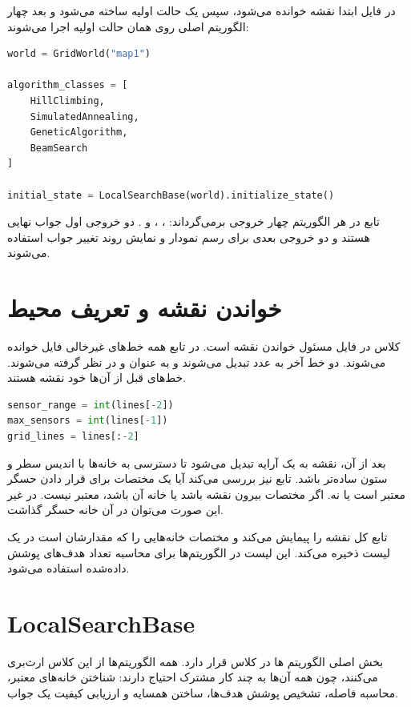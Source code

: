 \documentclass[10.5pt]{exam}
\begin{document}
در فایل
ابتدا نقشه خوانده می‌شود، سپس یک حالت اولیه ساخته می‌شود و بعد چهار الگوریتم اصلی روی همان حالت اولیه اجرا می‌شوند:

\begin{latin}
\begin{lstlisting}[language=Python]
world = GridWorld("map1")

algorithm_classes = [
    HillClimbing,
    SimulatedAnnealing,
    GeneticAlgorithm,
    BeamSearch
]

initial_state = LocalSearchBase(world).initialize_state()
\end{lstlisting}
\end{latin}

تابع
در هر الگوریتم چهار خروجی برمی‌گرداند:
،
،
و
.
دو خروجی اول جواب نهایی هستند و دو خروجی بعدی برای رسم نمودار و نمایش روند تغییر جواب استفاده می‌شوند.

\section{خواندن نقشه و تعریف محیط}
کلاس
در فایل
مسئول خواندن نقشه است. در تابع
همه خط‌های غیرخالی فایل خوانده می‌شوند. دو خط آخر به عدد تبدیل می‌شوند و به عنوان
و
در نظر گرفته می‌شوند. خط‌های قبل از آن‌ها خود نقشه هستند.

\begin{latin}
\begin{lstlisting}[language=Python]
sensor_range = int(lines[-2])
max_sensors = int(lines[-1])
grid_lines = lines[:-2]
\end{lstlisting}
\end{latin}

بعد از آن، نقشه به یک آرایه
تبدیل می‌شود تا دسترسی به خانه‌ها با اندیس سطر و ستون ساده‌تر باشد. تابع
نیز بررسی می‌کند آیا یک مختصات برای قرار دادن حسگر معتبر است یا نه. اگر مختصات بیرون نقشه باشد یا خانه آن
باشد، معتبر نیست. در غیر این صورت می‌توان در آن خانه حسگر گذاشت.

تابع
کل نقشه را پیمایش می‌کند و مختصات خانه‌هایی را که مقدارشان
است در یک لیست ذخیره می‌کند. این لیست در الگوریتم‌ها برای محاسبه تعداد هدف‌های پوشش داده‌شده استفاده می‌شود.

\section{LocalSearchBase}
بخش اصلی الگوریتم ها در کلاس
قرار دارد. همه الگوریتم‌ها از این کلاس ارث‌بری می‌کنند، چون همه آن‌ها به چند کار مشترک احتیاج دارند: شناختن خانه‌های معتبر، محاسبه فاصله، تشخیص پوشش هدف‌ها، ساختن همسایه و ارزیابی کیفیت یک جواب.
\end{document}
